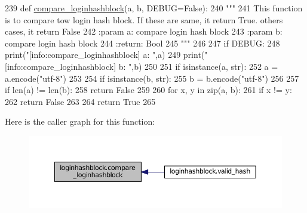 \begin{DoxyCode}
239 \textcolor{keyword}{def }\hyperlink{namespaceloginhashblock_ac24dd842eb90e0ede55e842d44148d5b}{compare\_loginhashblock}(a, b, DEBUG=False):
240     \textcolor{stringliteral}{"""}
241 \textcolor{stringliteral}{    This function is to compare tow login hash block. If these are same, it return True. others cases, it
       return False}
242 \textcolor{stringliteral}{    :param a: compare login hash block}
243 \textcolor{stringliteral}{    :param b: compare login hash block}
244 \textcolor{stringliteral}{    :return: Bool}
245 \textcolor{stringliteral}{    """}
246 
247     \textcolor{keywordflow}{if} DEBUG:
248         print(\textcolor{stringliteral}{"[info:compare\_loginhashblock] a: "},a)
249         print(\textcolor{stringliteral}{"[info:compare\_loginhashblock] b: "},b)
250 
251     \textcolor{keywordflow}{if} isinstance(a, str):
252         a = a.encode(\textcolor{stringliteral}{"utf-8"})
253 
254     \textcolor{keywordflow}{if} isinstance(b, str):
255         b = b.encode(\textcolor{stringliteral}{"utf-8"})
256 
257     \textcolor{keywordflow}{if} len(a) != len(b):
258         \textcolor{keywordflow}{return} \textcolor{keyword}{False}
259 
260     \textcolor{keywordflow}{for} x, y \textcolor{keywordflow}{in} zip(a, b):
261         \textcolor{keywordflow}{if} x != y:
262             \textcolor{keywordflow}{return} \textcolor{keyword}{False}
263 
264     \textcolor{keywordflow}{return} \textcolor{keyword}{True}
265 
\end{DoxyCode}


Here is the caller graph for this function\+:\nopagebreak
\begin{figure}[H]
\begin{center}
\leavevmode
\includegraphics[width=350pt]{namespaceloginhashblock_ac24dd842eb90e0ede55e842d44148d5b_icgraph}
\end{center}
\end{figure}



